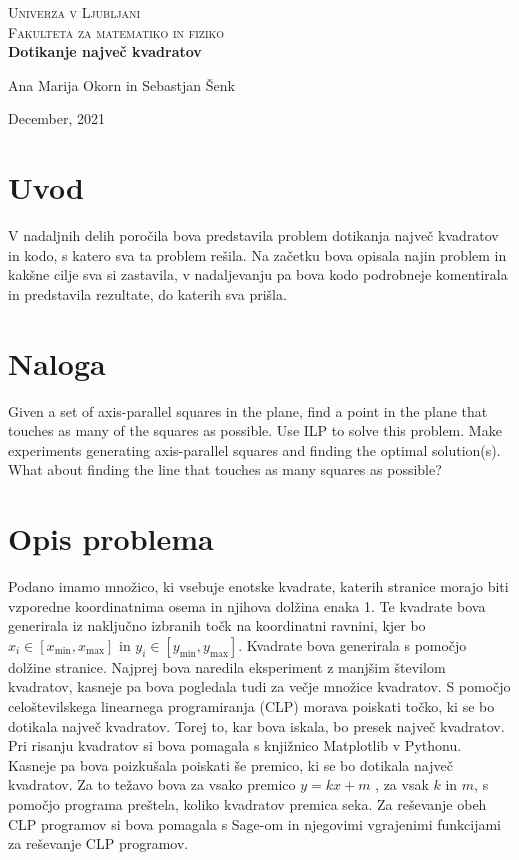 \documentclass[a4paper]{article}
\begin{document}
\begin{titlepage}
\center
\textsc{\LARGE Univerza v Ljubljani}\\[0.6cm]
\textsc{\Large Fakulteta za matematiko in fiziko}\\[0.6cm]

{\huge\bfseries Dotikanje največ kvadratov}\\[0.4cm]


\vfill\vfill\vfill

{ Ana Marija Okorn in Sebastjan Šenk}

{ December, 2021}

\vfill

\end{titlepage}

\tableofcontents

\newpage

\section{Uvod}

V  nadaljnih delih poročila bova predstavila problem dotikanja največ kvadratov in kodo, s katero sva ta problem rešila. Na začetku bova opisala najin problem in kakšne cilje sva si zastavila, v nadaljevanju pa bova kodo podrobneje komentirala in predstavila rezultate, do katerih sva prišla.

\section{Naloga}

Given a set of axis-parallel squares in the plane, find a point in the plane that touches as many of the squares as possible. Use ILP to solve this problem. Make experiments generating axis-parallel squares and finding the optimal solution(s). What about finding the line that touches as many squares as possible?

\section{Opis problema}

Podano imamo množico, ki vsebuje enotske kvadrate, katerih stranice morajo biti vzporedne koordinatnima osema in njihova dolžina enaka 1. Te kvadrate bova generirala iz naključno izbranih točk na koordinatni ravnini, kjer bo $x_i \in [x_{\min}, x_{\max}]$  in $y_i \in [y_{\min}, y_{\max}].$ Kvadrate bova generirala s pomočjo dolžine stranice. Najprej bova naredila eksperiment z manjšim številom kvadratov, kasneje pa bova pogledala tudi za večje množice kvadratov. S pomočjo celoštevilskega linearnega programiranja (CLP) morava poiskati točko, ki se bo dotikala največ kvadratov. Torej to, kar bova iskala, bo presek največ kvadratov. Pri risanju kvadratov si bova pomagala s knjižnico Matplotlib v Pythonu.  Kasneje pa bova poizkušala poiskati še premico, ki se bo dotikala največ kvadratov. Za to težavo bova za vsako premico $y = kx + m$ , za vsak $k$ in $m$, s pomočjo programa preštela, koliko kvadratov premica seka. Za reševanje obeh CLP programov si bova pomagala s Sage-om in njegovimi vgrajenimi funkcijami za reševanje CLP programov.
\end{document}
